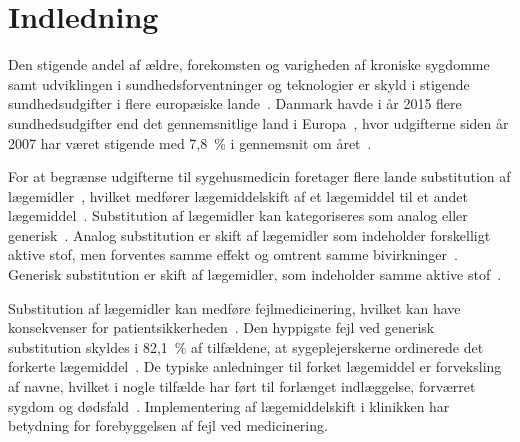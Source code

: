 \chapter{Indledning}
Den stigende andel af ældre, forekomsten og varigheden af kroniske sygdomme samt udviklingen i sundhedsforventninger og teknologier er skyld i stigende sundhedsudgifter i flere europæiske lande~\citep{Ess2003}. Danmark havde i år 2015 flere sundhedsudgifter end det gennemsnitlige land i Europa~\citep{EU2017}, hvor udgifterne siden år 2007 har været stigende med 7,8~\% i gennemsnit om året~\citep{Sundhed2016}.

For at begrænse udgifterne til sygehusmedicin foretager flere lande substitution af lægemidler~\citep{Ess2003,Johnston2011}, hvilket medfører lægemiddelskift af et lægemiddel til et andet lægemiddel~\citep{DanskSelskabforPatientsikkerhed2009, Kairi2017}. %
Substitution af lægemidler kan kategoriseres som analog eller generisk~\citep{DanskSelskabforPatientsikkerhed2009}.  
Analog substitution er skift af lægemidler som indeholder forskelligt aktive stof, men forventes samme effekt og omtrent samme bivirkninger~\citep{DanskSelskabforPatientsikkerhed2009,Kairi2017}. 
Generisk substitution er skift af lægemidler, som indeholder samme aktive stof~\citep{DanskSelskabforPatientsikkerhed2009,Kairi2017}. 

Substitution af lægemidler kan medføre fejlmedicinering, hvilket kan have konsekvenser for patientsikkerheden~\citep{Hakonsen2010}. Den hyppigste fejl ved generisk substitution skyldes i 82,1~\% af tilfældene, at sygeplejerskerne ordinerede det forkerte lægemiddel~\citep{Hakonsen2010}. De typiske anledninger til forket lægemiddel er forveksling af navne, hvilket i nogle tilfælde har ført til forlænget indlæggelse, forværret sygdom og dødsfald~\citep{DanskSelskabforPatientsikkerhed2009}. Implementering af lægemiddelskift i klinikken har betydning for forebyggelsen af fejl ved medicinering.

